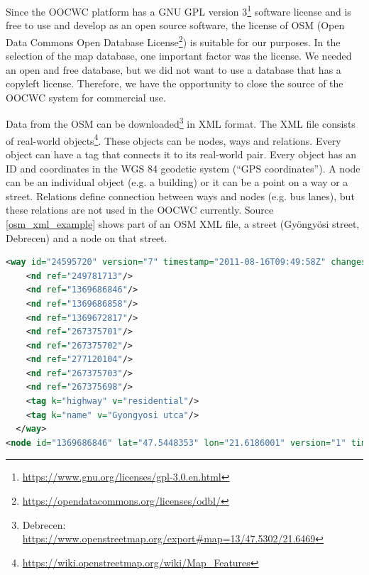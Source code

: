 \documentclass[b5paper,12pt]{report}
\theoremstyle{definition}
\begin{document}
Since the OOCWC platform has a GNU GPL version 3\footnote{\url{https://www.gnu.org/licenses/gpl-3.0.en.html}} software license and is free to use and develop as an open source software, the license of OSM (Open Data Commons Open Database License\footnote{\url{https://opendatacommons.org/licenses/odbl/}}) is suitable for our purposes. In the selection of the map database, one important factor was the license. We needed an open and free database, but we did not want to use a database that has a copyleft license. Therefore, we have the opportunity to close the source of the OOCWC system for commercial use.

Data from the OSM can be downloaded\footnote{Debrecen: \url{https://www.openstreetmap.org/export#map=13/47.5302/21.6469}} in XML format. The XML file consists of real-world objects\footnote{\url{https://wiki.openstreetmap.org/wiki/Map_Features}}. These objects can be nodes, ways and relations. Every object can have a tag that connects it to its real-world pair. Every object has an ID and coordinates in the WGS 84 geodetic system (\enquote{GPS coordinates}). A node can be an individual object (e.g. a building) or it can be a point on a way or a street. Relations define connection between ways and nodes (e.g. bus lanes), but these relations are not used in the OOCWC currently. Source \ref{osm_xml_example} shows part of an OSM XML file, a street (Gyöngyösi street, Debrecen) and a node on that street.

\begin{lstlisting}[language=XML,caption=Short example of OSM XML with a way in Debrecen (Gyöngyösi street) and a node on that way., label=osm_xml_example]
<way id="24595720" version="7" timestamp="2011-08-16T09:49:58Z" changeset="9033539" uid="247611" user="SzPaula">
    <nd ref="249781713"/>
    <nd ref="1369686846"/>
    <nd ref="1369686858"/>
    <nd ref="1369672817"/>
    <nd ref="267375701"/>
    <nd ref="267375702"/>
    <nd ref="277120104"/>
    <nd ref="267375703"/>
    <nd ref="267375698"/>
    <tag k="highway" v="residential"/>
    <tag k="name" v="Gyongyosi utca"/>
  </way>
<node id="1369686846" lat="47.5448353" lon="21.6186001" version="1" timestamp="2011-07-22T06:58:20Z" changeset="8794632" uid="493626" user="tamaas"/>
\end{lstlisting}
\end{document}
